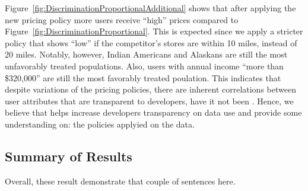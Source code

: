Figure~\ref{fig:DiscriminationProportionalAdditional} shows that after
applying the new  pricing policy more users receive ``high'' prices
compared to Figure~\ref{fig:DiscriminationProportional}. This is expected
since we apply a stricter policy that shows ``low'' if the competitor's
stores are within 10 miles,  instead of 20 miles. Notably, however, Indian Americans
and Alaskans are still the most unfavorably treated populations. Also, users
with annual income ``more than \$320,000'' are still the most favorably treated
poulation. This indicates that despite variations of the pricing policies,
there are inherent correlations between user attributes that are transparent
to developers, have it not been \sysname. Hence, we believe that \sysname
helps increase developers transparency on data use and provide some understanding
on: the policies applyied on the data.


\subsection{\normalsize Summary of Results}
Overall, these result demonstrate that couple of sentences here.

\begin{figure*}[t]
{
  \caption{\textbf{Prices shown to users and their dependency on income,
          race, and sex.} Shows the proportion of high versus low
          prices shown to users based on (a) income, (b) race, and (c) sex.
          In this case, pricing policy is stricter and shows ``low'' prices
          if user's distance from a competitor's store is less than 10 miles.
          Figure (a) reveals that a users with annual income less than
          \$5,000 still receives proportionaly more high prices than a user with
          annual income more than \$320,000. Figure (b) indicates that an
          Indian American or an Alaskan users still receives notably more high
          prices than any other user. Figure (c) shows that male and female
          users receive approximately the same proportion of high versus
          low prices.
  }
  \label{fig:DiscriminationProportionalAdditional}
}
\end{figure*}
